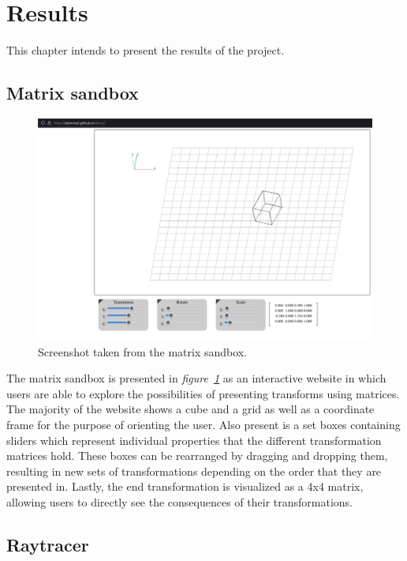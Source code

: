 \section{Results}
\label{ch:results}
\noindent	

This chapter intends to present the results of the project.

\subsection{Matrix sandbox}

\begin{figure}[H]
	\begin{center}
		\includegraphics[width=\textwidth]{./img/matrix_sandbox.png}
		\caption{Screenshot taken from the matrix sandbox.}
		\label{matsand}
	\end{center}
\end{figure}

The matrix sandbox is presented in \textit{figure~\ref{matsand}} as an interactive website in which users are able to explore the possibilities of presenting transforms using matrices. The majority of the website shows a cube and a grid as well as a coordinate frame for the purpose of orienting the user. Also present is a set boxes containing sliders which represent individual properties that the different transformation matrices hold. These boxes can be rearranged by dragging and dropping them, resulting in new sets of transformations depending on the order that they are presented in. Lastly, the end transformation is visualized as a 4x4 matrix, allowing users to directly see the consequences of their transformations.

\subsection{Raytracer}

